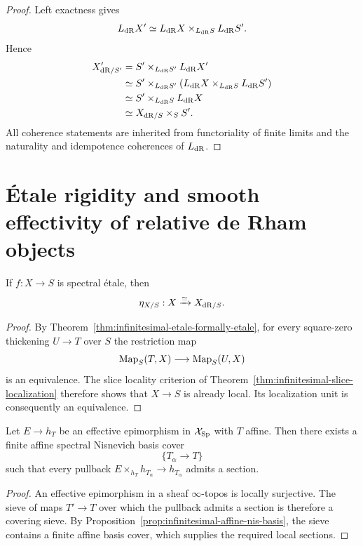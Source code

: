 \begin{proof}
Left exactness gives
\[
    L_{\mathrm{dR}}X'
    \simeq
    L_{\mathrm{dR}}X\times_{L_{\mathrm{dR}}S}L_{\mathrm{dR}}S'.
\]
Hence
\[
\begin{aligned}
    X'_{\mathrm{dR}/S'}
    &=S'\times_{L_{\mathrm{dR}}S'}L_{\mathrm{dR}}X'\\
    &\simeq
    S'\times_{L_{\mathrm{dR}}S'}
    \left(L_{\mathrm{dR}}X\times_{L_{\mathrm{dR}}S}L_{\mathrm{dR}}S'\right)\\
    &\simeq
    S'\times_{L_{\mathrm{dR}}S}L_{\mathrm{dR}}X\\
    &\simeq
    X_{\mathrm{dR}/S}\times_SS'.
\end{aligned}
\]
All coherence statements are inherited from functoriality of finite limits
and the naturality and idempotence coherences of $L_{\mathrm{dR}}$.
\end{proof}

\section{\'Etale rigidity and smooth effectivity of relative de Rham objects}
\label{sec:infinitesimal-dr-smooth-etale}

\begin{theorem}
\label{thm:infinitesimal-etale-dr-rigidity}
If $f:X\to S$ is spectral \'etale, then
\[
    \eta_{X/S}:X\xrightarrow{\simeq}X_{\mathrm{dR}/S}.
\]
\end{theorem}

\begin{proof}
By Theorem~\ref{thm:infinitesimal-etale-formally-etale}, for every square-zero
thickening $U\to T$ over $S$ the restriction map
\[
    \operatorname{Map}_S(T,X)\longrightarrow\operatorname{Map}_S(U,X)
\]
is an equivalence.  The slice locality criterion of
Theorem~\ref{thm:infinitesimal-slice-localization} therefore shows that
$X\to S$ is already local.  Its localization unit is consequently an
equivalence.
\end{proof}

\begin{lemma}
\label{lem:infinitesimal-effective-epi-local-splitting}
Let $E\to h_T$ be an effective epimorphism in $\mathcal X_{\mathrm{Sp}}$ with $T$
affine.  Then there exists a finite affine spectral Nisnevich basis cover
\[
    \{T_\alpha\to T\}
\]
such that every pullback $E\times_{h_T}h_{T_\alpha}\to h_{T_\alpha}$ admits
a section.
\end{lemma}

\begin{proof}
An effective epimorphism in a sheaf $\infty$-topos is locally surjective.  The
sieve of maps $T'\to T$ over which the pullback admits a section is therefore
a covering sieve.  By Proposition~\ref{prop:infinitesimal-affine-nis-basis},
the sieve contains a finite affine basis cover, which supplies the required
local sections.
\end{proof}

